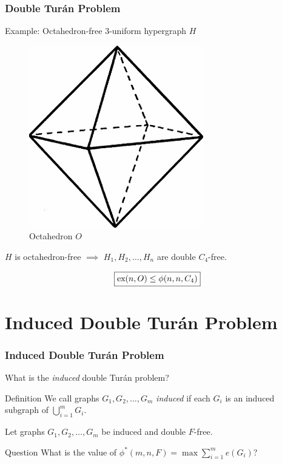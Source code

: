 \documentclass{beamer}
\newcommand*{\ex}{\textnormal{ex}}
\begin{document}
\begin{frame}
  \frametitle{Double Turán Problem}

  Example: Octahedron-free 3-uniform hypergraph $H$

  \pause

  \begin{figure}
    \includegraphics[width=0.15\linewidth]{oct}
    \caption{Octahedron $O$}
    \centering
  \end{figure}

  \pause

  \begin{center}
    $H$ is octahedron-free $\implies$ $H_1, H_2, \ldots, H_n$ are double $C_4$-free.
  \end{center}

  \pause

  \[
    \boxed{\ex(n, O) \leq \phi(n, n, C_4)}
  \]
\end{frame}

\section{Induced Double Turán Problem}

\begin{frame}
  \frametitle{Induced Double Turán Problem}

  What is the \textit{induced} double Turán problem? \pause

  \begin{block}{Definition}
    We call graphs $G_1, G_2, \ldots, G_m$ \textit{induced} if each $G_i$ is an induced subgraph of $\bigcup_{i = 1}^m G_i$.
  \end{block}

  \pause

  \vspace{0.5cm}

  Let graphs $G_1, G_2, \ldots, G_m$ be induced and double $F$-free.

  \begin{block}{Question}
    What is the value of $\phi^*(m, n, F) = \max \sum_{i = 1}^m e(G_i)$?
  \end{block}
\end{frame}
\end{document}
